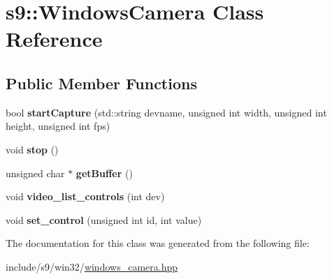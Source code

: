 \hypertarget{classs9_1_1WindowsCamera}{\section{s9\-:\-:Windows\-Camera Class Reference}
\label{classs9_1_1WindowsCamera}
}
\subsection*{Public Member Functions}
\begin{DoxyCompactItemize}
\item 
\hypertarget{classs9_1_1WindowsCamera_aa51929a1320b998f49f48ac2924202ad}{bool {\bfseries start\-Capture} (std\-::string devname, unsigned int width, unsigned int height, unsigned int fps)}\label{classs9_1_1WindowsCamera_aa51929a1320b998f49f48ac2924202ad}

\item 
\hypertarget{classs9_1_1WindowsCamera_affd8788e83b2ae39b1797e83c7cf4217}{void {\bfseries stop} ()}\label{classs9_1_1WindowsCamera_affd8788e83b2ae39b1797e83c7cf4217}

\item 
\hypertarget{classs9_1_1WindowsCamera_aebfa3f5d5e8716c46a7d0db72dd699eb}{unsigned char $\ast$ {\bfseries get\-Buffer} ()}\label{classs9_1_1WindowsCamera_aebfa3f5d5e8716c46a7d0db72dd699eb}

\item 
\hypertarget{classs9_1_1WindowsCamera_a5f0c28c90d3a0c9841e8ea6ba2f45314}{void {\bfseries video\-\_\-list\-\_\-controls} (int dev)}\label{classs9_1_1WindowsCamera_a5f0c28c90d3a0c9841e8ea6ba2f45314}

\item 
\hypertarget{classs9_1_1WindowsCamera_ade1fc2128f889de808ecf33ae25c49a0}{void {\bfseries set\-\_\-control} (unsigned int id, int value)}\label{classs9_1_1WindowsCamera_ade1fc2128f889de808ecf33ae25c49a0}

\end{DoxyCompactItemize}


The documentation for this class was generated from the following file\-:\begin{DoxyCompactItemize}
\item 
include/s9/win32/\hyperlink{windows__camera_8hpp}{windows\-\_\-camera.\-hpp}\end{DoxyCompactItemize}
